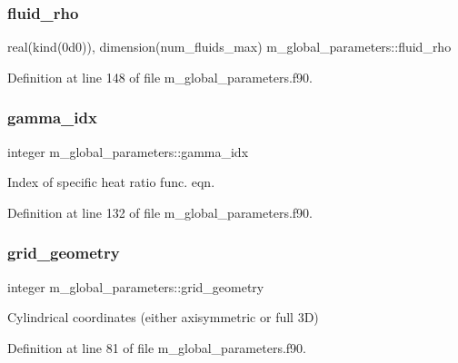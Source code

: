 \subsubsection{\texorpdfstring{fluid\+\_\+rho}{fluid\_rho}}
{\footnotesize\ttfamily real(kind(0d0)), dimension(num\+\_\+fluids\+\_\+max) m\+\_\+global\+\_\+parameters\+::fluid\+\_\+rho}



Definition at line 148 of file m\+\_\+global\+\_\+parameters.\+f90.

\mbox{\label{namespacem__global__parameters_a4ecdedaf3db880f8d71dbefc816322f8}} 
\subsubsection{\texorpdfstring{gamma\+\_\+idx}{gamma\_idx}}
{\footnotesize\ttfamily integer m\+\_\+global\+\_\+parameters\+::gamma\+\_\+idx}



Index of specific heat ratio func. eqn. 



Definition at line 132 of file m\+\_\+global\+\_\+parameters.\+f90.

\mbox{\label{namespacem__global__parameters_a0f2d413d9739928f8e1a98f0a5783ab9}} 
\subsubsection{\texorpdfstring{grid\+\_\+geometry}{grid\_geometry}}
{\footnotesize\ttfamily integer m\+\_\+global\+\_\+parameters\+::grid\+\_\+geometry}



Cylindrical coordinates (either axisymmetric or full 3D) 



Definition at line 81 of file m\+\_\+global\+\_\+parameters.\+f90.

\mbox{\label{namespacem__global__parameters_a46461347b5094736adfa94ef005b49a6}} 
